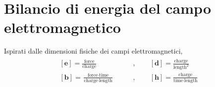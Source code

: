\documentclass[letterpaper,10pt,english]{jupyterBook}
\begin{document}
\chapter{Bilancio di energia del campo elettromagnetico}
\label{\detokenize{ch/energy:bilancio-di-energia-del-campo-elettromagnetico}}\label{\detokenize{ch/energy:classical-electromagnetism-energy}}\label{\detokenize{ch/energy::doc}}
\sphinxAtStartPar
Ispirati dalle dimensioni fisiche dei campi elettromagnetici,
\begin{equation*}
\begin{split}\begin{aligned}
\left[\mathbf{e}\right] = \frac{\text{force}}{\text{charge}} \qquad & , \qquad
[\mathbf{d}] = \frac{\text{charge}}{\text{length}^2} \\
[\mathbf{b}] = \frac{\text{force}\cdot\text{time}}{\text{charge}\cdot\text{length}} \qquad & , \qquad
[\mathbf{h}] = \frac{\text{charge}}{\text{time} \cdot \text{length}}
\end{aligned}\end{split}
\end{equation*}
\end{document}
